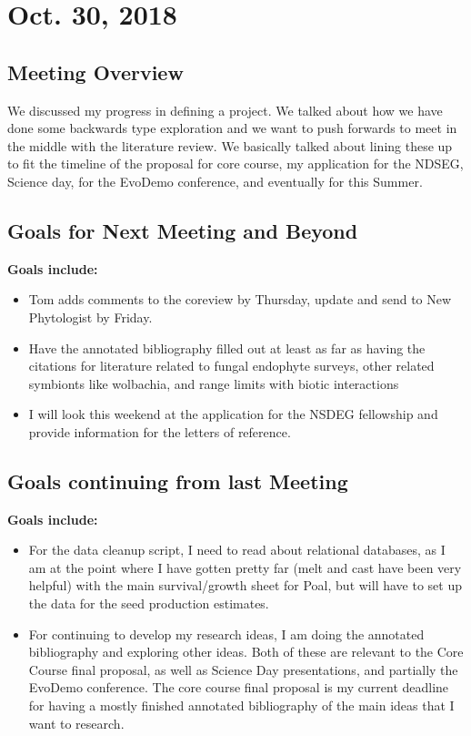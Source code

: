 \documentclass{article}
\begin{document}
\section*{Oct. 30, 2018}

\subsection*{Meeting Overview}

We discussed my progress in defining a project. We talked about how we have done some backwards type exploration and we want to push forwards to meet in the middle with the literature review. We basically talked about lining these up to fit the timeline of the proposal for core course, my application for the NDSEG, Science day, for the EvoDemo conference, and eventually for this Summer.
 
\subsection*{Goals for Next Meeting and Beyond}
\textbf{Goals include:} 
\begin{itemize}
\item{Tom adds comments to the coreview by Thursday, update and send to New Phytologist by Friday.}
\item{Have the annotated bibliography filled out at least as far as having the citations for literature related to fungal endophyte surveys, other related symbionts like wolbachia, and range limits with biotic interactions}
\item{I will look this weekend at the application for the NSDEG fellowship and provide information for the letters of reference.}
\end{itemize}

\subsection*{Goals continuing from last Meeting}
\textbf{Goals include:} 
\begin{itemize}
\item{For the data cleanup script, I need to read about relational databases, as I am at the point where I have gotten pretty far (melt and cast have been very helpful) with the main survival/growth sheet for Poal, but will have to set up the data for the seed production estimates.}
\item{For continuing to develop my research ideas, I am doing the annotated bibliography and exploring other ideas. Both of these are relevant to the Core Course final proposal, as well as Science Day presentations, and partially the EvoDemo conference. The core course final proposal is my current deadline for having a mostly finished annotated bibliography of the main ideas that I want to research.}
\end{itemize}
\end{document}
